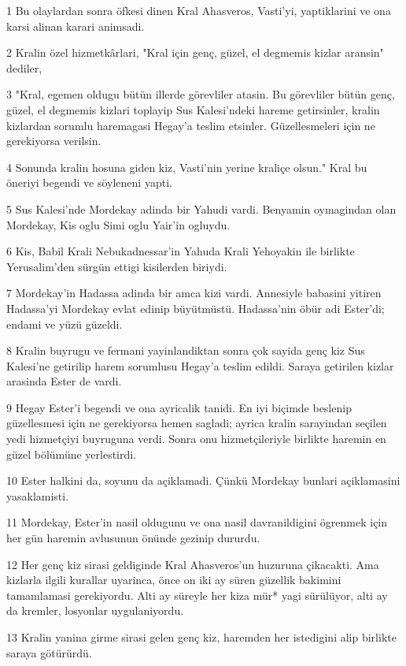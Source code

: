\par 1 Bu olaylardan sonra öfkesi dinen Kral Ahasveros, Vasti'yi, yaptiklarini ve ona karsi alinan karari animsadi.
\par 2 Kralin özel hizmetkârlari, "Kral için genç, güzel, el degmemis kizlar aransin" dediler,
\par 3 "Kral, egemen oldugu bütün illerde görevliler atasin. Bu görevliler bütün genç, güzel, el degmemis kizlari toplayip Sus Kalesi'ndeki hareme getirsinler, kralin kizlardan sorumlu haremagasi Hegay'a teslim etsinler. Güzellesmeleri için ne gerekiyorsa verilsin.
\par 4 Sonunda kralin hosuna giden kiz, Vasti'nin yerine kraliçe olsun." Kral bu öneriyi begendi ve söyleneni yapti.
\par 5 Sus Kalesi'nde Mordekay adinda bir Yahudi vardi. Benyamin oymagindan olan Mordekay, Kis oglu Simi oglu Yair'in ogluydu.
\par 6 Kis, Babil Krali Nebukadnessar'in Yahuda Krali Yehoyakin ile birlikte Yerusalim'den sürgün ettigi kisilerden biriydi.
\par 7 Mordekay'in Hadassa adinda bir amca kizi vardi. Annesiyle babasini yitiren Hadassa'yi Mordekay evlat edinip büyütmüstü. Hadassa'nin öbür adi Ester'di; endami ve yüzü güzeldi.
\par 8 Kralin buyrugu ve fermani yayinlandiktan sonra çok sayida genç kiz Sus Kalesi'ne getirilip harem sorumlusu Hegay'a teslim edildi. Saraya getirilen kizlar arasinda Ester de vardi.
\par 9 Hegay Ester'i begendi ve ona ayricalik tanidi. En iyi biçimde beslenip güzellesmesi için ne gerekiyorsa hemen sagladi; ayrica kralin sarayindan seçilen yedi hizmetçiyi buyruguna verdi. Sonra onu hizmetçileriyle birlikte haremin en güzel bölümüne yerlestirdi.
\par 10 Ester halkini da, soyunu da açiklamadi. Çünkü Mordekay bunlari açiklamasini yasaklamisti.
\par 11 Mordekay, Ester'in nasil oldugunu ve ona nasil davranildigini ögrenmek için her gün haremin avlusunun önünde gezinip dururdu.
\par 12 Her genç kiz sirasi geldiginde Kral Ahasveros'un huzuruna çikacakti. Ama kizlarla ilgili kurallar uyarinca, önce on iki ay süren güzellik bakimini tamamlamasi gerekiyordu. Alti ay süreyle her kiza mür* yagi sürülüyor, alti ay da kremler, losyonlar uygulaniyordu.
\par 13 Kralin yanina girme sirasi gelen genç kiz, haremden her istedigini alip birlikte saraya götürürdü.
